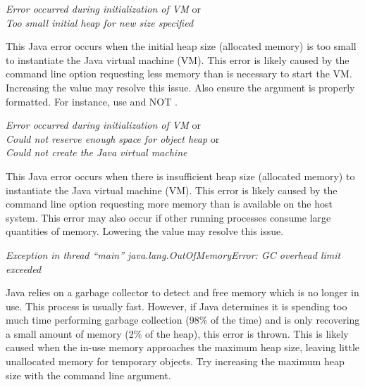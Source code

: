 \noindent
\textit{Error occurred during initialization of VM} or\\
\textit{Too small initial heap for new size specified}
\begin{indented}
  This Java error occurs when the initial heap size (allocated memory) is too small to instantiate the Java virtual machine (VM).  This error is likely caused by the  command line option requesting less memory than is necessary to start the VM.  Increasing the  value may resolve this issue. Also ensure the  argument is properly formatted.  For instance, use  and NOT .
\end{indented}

\noindent
\textit{Error occurred during initialization of VM} or\\
\textit{Could not reserve enough space for object heap} or\\
\textit{Could not create the Java virtual machine}
\begin{indented}
  This Java error occurs when there is insufficient heap size (allocated memory) to instantiate the Java virtual machine (VM).  This error is likely caused by the  command line option requesting more memory than is available on the host system.  This error may also occur if other running processes consume large quantities of memory.  Lowering the  value may resolve this issue.
\end{indented}

\noindent
\textit{Exception in thread ``main'' java.lang.OutOfMemoryError: GC overhead limit exceeded}
\begin{indented}
  Java relies on a garbage collector to detect and free memory which is no longer in use.  This process is usually fast.  However, if Java determines it is spending too much time performing garbage collection (98\% of the time) and is only recovering a small amount of memory (2\% of the heap), this error is thrown.  This is likely caused when the in-use memory approaches the maximum heap size, leaving little unallocated memory for temporary objects.  Try  increasing the maximum heap size with the  command line argument.
\end{indented}

